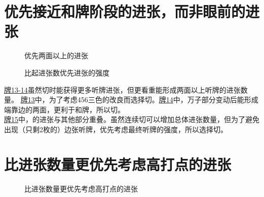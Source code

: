 \section{优先接近和牌阶段的进张，而非眼前的进张}
\begin{figure}
    \caption{优先两面以上的进张}
    \label{lec6:pai13-14}
    \par\bigskip
\end{figure}
\begin{figure}
    \caption{比起进张数优先进张的强度}
    \label{lec6:pai15}
\end{figure}
\hyperref[lec6:pai13-14]{牌13-14}虽然切时能获得更多听牌进张，但更看重能形成两面以上听牌的进张数量。
\hyperref[lec6:pai13-14]{牌13}中，为了考虑456三色的改良而选择切。\hyperref[lec6:pai13-14]{牌14}中，万子部分变动后能形成端靠边的两面，更利于和牌，所以切。\\
\hyperref[lec6:pai15]{牌15}中，的进张与其他部分重叠。虽然连续切可以增加总体进张数量，但为了避免出现（只剩2枚的）边张听牌，优先考虑最终听牌的强度，所以选择切。

\section{比进张数量更优先考虑高打点的进张}
\begin{figure}[h]
    \caption{比进张数量更优先考虑高打点的进张}
    \label{lec6:pai16-21}
    \par\bigskip
    \par\bigskip
    \par\bigskip
    \par\bigskip
    \par\bigskip
\end{figure}

